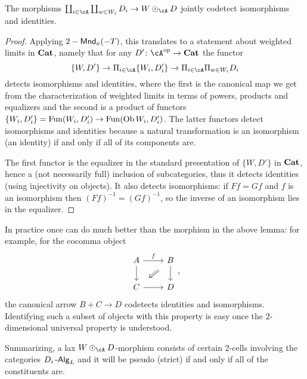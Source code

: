 \documentclass[a4paper,11pt,oneside,openany]{scrbook}
\begin{document}
\begin{lemma}
    The morphisms $\coprod_{i\in \cA}\coprod_{w\in W_i}D_i\rightarrow W\odot_\cA
    D$ jointly codetect isomorphisms and identities.
\end{lemma}
\begin{proof}
    Applying $2-\operatorname{\mathsf{Mnd}}_\kappa(-T)$, this translates to a statement about weighted
    limits in ${\normalfont\textbf{Cat}}$, namely that for any $D'\colon\cA^{\op}\rightarrow\Cat$ the
    functor
    \[\{W,D'\}\rightarrow
    \Pi_{i\in\cA}\{W_i,D'_i\}\rightarrow
    \Pi_{i\in\cA}\Pi_{w\in
    W_i}D_i\]
    detects isomorphisms and identities, where the first is the canonical map we
    get from the characterization of weighted limits in terms of powers,
    products and equalizers and the second is a product of functors
    $\{W_i,D'_i\}=\operatorname{Fun}(W_i,D'_i)\rightarrow\operatorname{Fun}(\operatorname{Ob} W_i,D'_i)$.
     The latter functors detect isomorphisms and identities because a natural
     transformation is an isomorphism (an identity) if and only if all of its
     components are.

     The first functor is the equalizer in the standard
     presentation of $\{W,D'\}$ in ${\normalfont\textbf{Cat}}$, hence a (not necessarily full)
     inclusion of subcategories, thus it detects identities (using injectivity
     on objects). It also detects isomorphisms: if $Ff=Gf$ and $f$ is an
     isomorphism then $(Ff)^{-1}=(Gf)^{-1}$, so the inverse of an isomorphism
     lies in the equalizer.
\end{proof}

\begin{rmk}
    In practice once can do much better than the morphism in the above lemma:
    for example, for the cocomma object
    \[\begin{tikzcd}
        A & B \\
        C & D
        \arrow[from=1-2, to=2-2]
        \arrow["f", from=1-1, to=1-2]
        \arrow[from=2-1, to=2-2]
        \arrow[from=1-1, to=2-1]
        \arrow[shorten <=8pt, shorten >=8pt, Rightarrow, from=1-2, to=2-1]
    \end{tikzcd},\]
    the canonical arrow $B+C\rightarrow D$ codetects identities and
    isomorphisms. Identifying such a subset of objects with this property is
    easy once the 2-dimensional universal property is understood.
\end{rmk}

Summarizing, a lax $W\odot_\cA D$-morphism consists of certain 2-cells involving
the categories $D_i\operatorname{-\mathsf{Alg}}_L$ and it will be pseudo (strict) if and only if all of
the constituents are.
\end{document}
